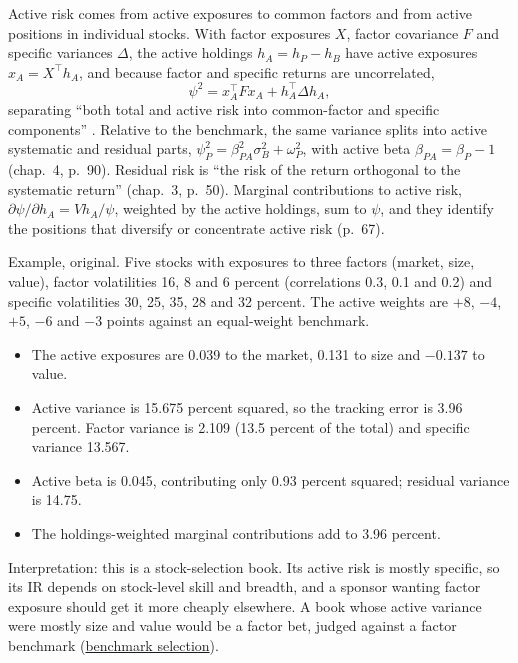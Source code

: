 \begin{qfmethod}\label{meth:active-risk-decomposition}
 Active risk comes from active exposures to common factors and from active positions in individual stocks. With factor exposures $X$, factor covariance $F$ and specific variances $\Delta$, the active holdings $h_A=h_P-h_B$ have active exposures $x_A=X^\top h_A$, and because factor and specific returns are uncorrelated,
\[ \psi^2=x_A^\top F x_A+h_A^\top\Delta h_A, \]
separating ``both total and active risk into common-factor and specific components'' \citep[chap.~3, Technical Appendix, pp.~76--77]{alpha-grinold}. Relative to the benchmark, the same variance splits into active systematic and residual parts, $\psi_P^2=\beta_{PA}^2\sigma_B^2+\omega_P^2$, with active beta $\beta_{PA}=\beta_P-1$ (chap.~4, p.~90). Residual risk is ``the risk of the return orthogonal to the systematic return'' (chap.~3, p.~50). Marginal contributions to active risk, $\partial\psi/\partial h_A=Vh_A/\psi$, weighted by the active holdings, sum to $\psi$, and they identify the positions that diversify or concentrate active risk (p.~67).

 Example, original. Five stocks with exposures to three factors (market, size, value), factor volatilities 16, 8 and 6 percent (correlations 0.3, 0.1 and 0.2) and specific volatilities 30, 25, 35, 28 and 32 percent. The active weights are $+8$, $-4$, $+5$, $-6$ and $-3$ points against an equal-weight benchmark.
\begin{itemize}
\item The active exposures are 0.039 to the market, 0.131 to size and $-0.137$ to value.
\item Active variance is 15.675 percent squared, so the tracking error is 3.96 percent. Factor variance is 2.109 (13.5 percent of the total) and specific variance 13.567.
\item Active beta is 0.045, contributing only 0.93 percent squared; residual variance is 14.75.
\item The holdings-weighted marginal contributions add to 3.96 percent.
\end{itemize}
Interpretation: this is a stock-selection book. Its active risk is mostly specific, so its IR depends on stock-level skill and breadth, and a sponsor wanting factor exposure should get it more cheaply elsewhere. A book whose active variance were mostly size and value would be a factor bet, judged against a factor benchmark (\hyperref[meth:benchmark-selection-quality]{benchmark selection}).


\end{qfmethod}
